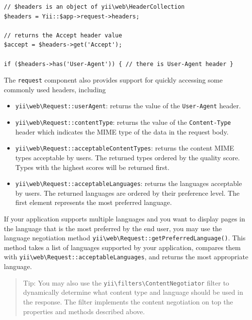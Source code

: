 \lstset{language=php}\begin{lstlisting}
// $headers is an object of yii\web\HeaderCollection 
$headers = Yii::$app->request->headers;

// returns the Accept header value
$accept = $headers->get('Accept');

if ($headers->has('User-Agent')) { // there is User-Agent header }
\end{lstlisting}
The \lstinline|request| component also provides support for quickly accessing some commonly used headers, including

\begin{itemize}
\item \texttt{yii{\allowbreak{}\textbackslash}web{\allowbreak{}\textbackslash}Request\allowbreak{}::\allowbreak{}userAgent}: returns the value of the \lstinline|User-Agent| header.
\item \texttt{yii{\allowbreak{}\textbackslash}web{\allowbreak{}\textbackslash}Request\allowbreak{}::\allowbreak{}contentType}: returns the value of the \lstinline|Content-Type| header which indicates
the MIME type of the data in the request body.
\item \texttt{yii{\allowbreak{}\textbackslash}web{\allowbreak{}\textbackslash}Request\allowbreak{}::\allowbreak{}acceptableContentTypes}: returns the content MIME types acceptable by users.
The returned types ordered by the quality score. Types with the highest scores will be returned first.
\item \texttt{yii{\allowbreak{}\textbackslash}web{\allowbreak{}\textbackslash}Request\allowbreak{}::\allowbreak{}acceptableLanguages}: returns the languages acceptable by users.
The returned languages are ordered by their preference level. The first element represents the most preferred language.
\end{itemize}
If your application supports multiple languages and you want to display pages in the language that is the most preferred
by the end user, you may use the language negotiation method \texttt{yii{\allowbreak{}\textbackslash}web{\allowbreak{}\textbackslash}Request\allowbreak{}::\allowbreak{}getPreferredLanguage()}.
This method takes a list of languages supported by your application, compares them with \texttt{yii{\allowbreak{}\textbackslash}web{\allowbreak{}\textbackslash}Request\allowbreak{}::\allowbreak{}acceptableLanguages},
and returns the most appropriate language.

\begin{quote}Tip: You may also use the \texttt{yii{\allowbreak{}\textbackslash}filters{\allowbreak{}\textbackslash}ContentNegotiator} filter to dynamically determine 
  what content type and language should be used in the response. The filter implements the content negotiation
  on top the properties and methods described above.

\end{quote}
